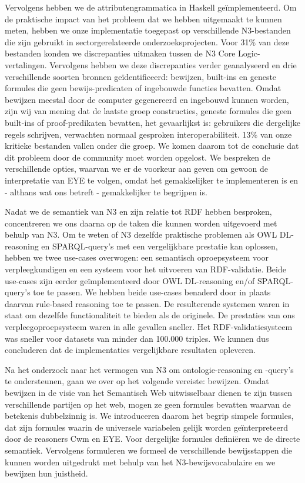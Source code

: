 Vervolgens hebben we de attributengrammatica in Haskell geïmplementeerd. 
Om de praktische impact van het probleem dat we hebben uitgemaakt te kunnen
meten, hebben we onze implementatie toegepast op verschillende N3-bestanden die zijn gebruikt in
sectorgerelateerde onderzoeksprojecten. Voor 31\% van deze bestanden konden we discrepanties
uitmaken tussen de N3 Core Logic-vertalingen. Vervolgens hebben we deze discrepanties verder
geanalyseerd en drie verschillende soorten bronnen geïdentificeerd: bewijzen, built-ins en geneste
formules die geen bewijs-predicaten of ingebouwde functies bevatten. Omdat bewijzen meestal door
de computer gegenereerd en ingebouwd kunnen worden, zijn wij van mening dat de laatste groep
constructies, geneste formules die geen built-ins of proof-predikaten bevatten, het gevaarlijkst is:
gebruikers die dergelijke regels schrijven, verwachten normaal gesproken interoperabiliteit. 13\% van
onze kritieke bestanden vallen onder die groep. We komen daarom tot de conclusie dat dit probleem
door de community moet worden opgelost. We bespreken de verschillende opties, waarvan we er de
voorkeur aan geven om gewoon de interpretatie van EYE te volgen, omdat het gemakkelijker te
implementeren is en - althans wat ons betreft - gemakkelijker te begrijpen is.

Nadat we de semantiek van N3 en zijn relatie tot RDF hebben besproken, concentreren we ons
daarna op de taken die kunnen worden uitgevoerd met behulp van N3. Om te weten of N3 dezelfde
praktische problemen als OWL DL-reasoning en SPARQL-query's met een vergelijkbare prestatie kan
oplossen, hebben we twee use-cases overwogen: een semantisch oproepsysteem voor
verpleegkundigen en een systeem voor het uitvoeren van RDF-validatie. Beide use-cases zijn eerder
geïmplementeerd door OWL DL-reasoning en/of SPARQL-query's toe te passen. We hebben beide
use-cases benaderd door in plaats daarvan rule-based reasoning toe te passen. De resulterende
systemen waren in staat om dezelfde functionaliteit te bieden als de originele. De prestaties van ons
verpleegoproepsysteem waren in alle gevallen sneller. Het RDF-validatiesysteem was sneller voor
datasets van minder dan 100.000 triples. We kunnen dus concluderen dat de implementaties
vergelijkbare resultaten opleveren.

Na het onderzoek naar het vermogen van N3 om ontologie-reasoning en -query’s te ondersteunen,
gaan we over op het volgende vereiste: bewijzen. Omdat bewijzen in de visie van het Semantisch
Web uitwisselbaar dienen te zijn tussen verschillende partijen op het web, mogen ze geen formules
bevatten waarvan de betekenis dubbelzinnig is. We introduceren daarom het begrip simpele
formules, dat zijn formules waarin de universele variabelen gelijk worden geïnterpreteerd door de
reasoners Cwm en EYE. Voor dergelijke formules definiëren we de directe semantiek. Vervolgens
formuleren we formeel de verschillende bewijsstappen die kunnen worden uitgedrukt met behulp
van het N3-bewijsvocabulaire en we bewijzen hun juistheid.

